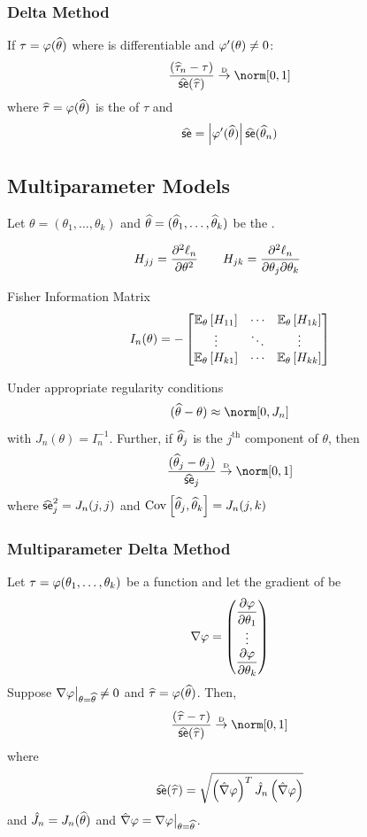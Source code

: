 \documentclass[landscape]{article}
\begin{document}
\begin{multicols*}{2}
\subsubsection{Delta Method}
If $\tau=\transform(\that)$ where \transform is differentiable and
$\transform^\prime(\theta) \neq 0$:
$$\frac{(\widehat{\tau}_n-\tau)}{\sehat(\widehat{\tau})} \dconv \norm[0,1]$$
where $\widehat{\tau} = \transform(\that)$ is the \mle of $\tau$ and
$$\sehat =
\left|\transform^\prime(\that)\right|\sehat(\that_n)$$

\subsection{Multiparameter Models}

Let $\theta=(\theta_1,\dots,\theta_k)$ and 
$\that= (\that_1,\dots,\that_k)$ be the \mle.

$$H_{jj} = \frac{\partial^2 \lln}{\partial\theta^2} \qquad
H_{jk} = \frac{\partial^2 \lln}{\partial\theta_j\partial\theta_k} \qquad$$

Fisher Information Matrix
$$I_n(\theta) = -\begin{bmatrix}
  \E[\theta]{H_{11}} & \cdots & \E[\theta]{H_{1k}} \\
  \vdots & \ddots & \vdots \\
  \E[\theta]{H_{k1}} & \cdots & \E[\theta]{H_{kk}}
\end{bmatrix}$$

Under appropriate regularity conditions
$$(\that-\theta) \approx \norm[0,J_n]$$
with $J_n(\theta) = I_n^{-1}$. Further, if $\that_j$ is the
$j^{\mathrm{th}}$ component of $\theta$, then
$$\frac{(\that_j-\theta_j)}{\sehat_j} \dconv \norm[0,1]$$
where $\sehat_j^2 = J_n(j,j)$ and 
$\cov{\that_j,\that_k} = J_n(j,k)$

\subsubsection{Multiparameter Delta Method}

Let $\tau = \transform(\theta_1,\dots,\theta_k)$ be a function and let
the gradient of \transform be
$$\nabla\transform = \begin{pmatrix}
  \displaystyle\frac{\partial\transform}{\partial\theta_1} \\
  \vdots \\
  \displaystyle\frac{\partial\transform}{\partial\theta_k} \\
\end{pmatrix}$$
Suppose $\bigl.\nabla\transform\bigr|_{\theta=\that} \neq 0$ and
$\widehat{\tau} = \transform(\that)$. Then,
$$\frac{(\widehat{\tau}-\tau)}{\sehat(\widehat{\tau})} \dconv \norm[0,1]$$
where
$$\sehat(\widehat{\tau}) = \sqrt{\left( \hat{\nabla}\transform \right)^T
\hat{J}_n\left( \hat{\nabla}\transform \right)}$$
and $\hat{J}_n = J_n(\that)$ and $\hat{\nabla}\transform =
\bigl.\nabla\transform\bigr|_{\theta=\that}$. 


\end{multicols*}
\end{document}

